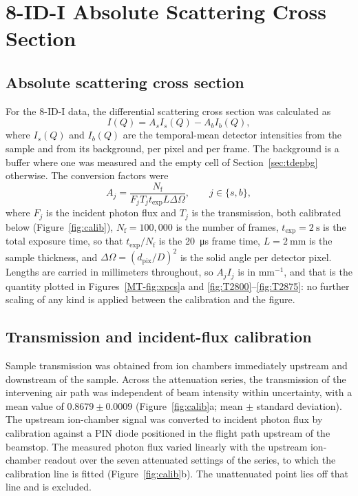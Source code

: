 \documentclass[11pt]{article}
\begin{document}
\section{8-ID-I Absolute Scattering Cross Section}
\label{sec:b8saxs}
\subsection{Absolute scattering cross section}
For the 8-ID-I data, the differential scattering cross section was calculated as
\begin{equation}
 I(Q)=A_s I_s(Q)-A_b I_b(Q),
 \end{equation}
where $I_s(Q)$ and $I_b(Q)$ are the temporal-mean detector intensities from the sample and from its background, per pixel and per frame. The background is a buffer where one was measured and the empty cell of Section~\ref{sec:tdepbg} otherwise. The conversion factors were
\begin{equation}
 A_j=\frac{N_{\mathrm{f}}}{F_jT_jt_{\mathrm{exp}}L\Delta\Omega},\qquad j\in\{s,b\},
 \end{equation}
where $F_j$ is the incident photon flux and $T_j$ is the transmission, both calibrated below (Figure~\ref{fig:calib}), $N_{\mathrm{f}}=100{,}000$ is the number of frames, $t_{\mathrm{exp}}=\SI{2}{\second}$ is the total exposure time, so that $t_{\mathrm{exp}}/N_{\mathrm{f}}$ is the \SI{20}{\micro\second} frame time, $L=\SI{2}{\milli\meter}$ is the sample thickness, and $\Delta\Omega=(d_{\mathrm{pix}}/D)^2$ is the solid angle per detector pixel.\cite{Sheyfer2020-yb} Lengths are carried in millimeters throughout, so $A_jI_j$ is in mm$^{-1}$, and that is the quantity plotted in Figures~\ref*{MT-fig:xpcs}a and \ref{fig:T2800}--\ref{fig:T2875}: no further scaling of any kind is applied between the calibration and the figure.

\subsection{Transmission and incident-flux calibration}
Sample transmission was obtained from ion chambers immediately upstream and downstream of the sample. Across the attenuation series, the transmission of the intervening air path was independent of beam intensity within uncertainty, with a mean value of $0.8679\pm0.0009$ (Figure~\ref{fig:calib}a; mean $\pm$ standard deviation). The upstream ion-chamber signal was converted to incident photon flux by calibration against a PIN diode positioned in the flight path upstream of the beamstop. The measured photon flux varied linearly with the upstream ion-chamber readout over the seven attenuated settings of the series, to which the calibration line is fitted (Figure~\ref{fig:calib}b). The unattenuated point lies off that line and is excluded.
\end{document}
